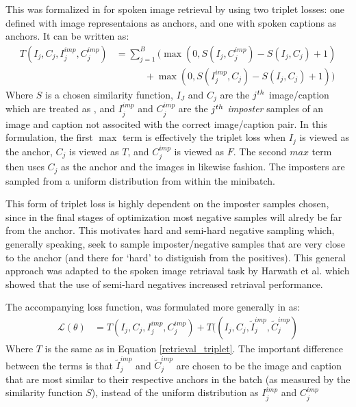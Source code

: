 This was formalized in \cite{harwath2017unsupervised} for spoken image retrieval by using two triplet losses: one defined with image representaions as anchors, and one with spoken captions as anchors.
It can be written as:
\begin{align}
    \label{retrieval_triplet}
    T(I_j, C_j, I_j^{imp}, C_j^{imp}) &= \sum_{j=1}^B \Big(\max(0,S(I_j, C_j^{imp}) - S(I_j, C_j) +1) \\
                                      &{\quad\quad\quad+} \max(0,S(I_j^{imp}, C_j) - S(I_j, C_j) +1)\Big)
\end{align}
Where $S$ is a chosen similarity function,  $I_J$ and $C_j$ are the $j^{th}$  image/caption which are treated as , and $I_j^{imp}$ and $C_j^{imp}$ are the $j^{th}$ \textit{imposter} samples of an image and caption not associted with the correct image/caption pair.
In this formulation, the first $\max$ term is effectively the triplet loss when  $I_j$ is viewed as the anchor, $C_j$ is viewed as $T$, and  $C_j^{imp}$ is viewed as $F$.
The second $max$ term then uses $C_j$ as the anchor and the images in likewise fashion.
The imposters are sampled from a uniform distribution from within the minibatch.

This form of triplet loss is highly dependent on the imposter samples chosen, since in the final stages of optimization most negative samples will alredy be far from the anchor.
This motivates hard and semi-hard negative sampling \cite{jansen2018unsupervised} which, generally speaking, seek to sample imposter/negative samples that are very close to the anchor (and there for `hard' to distiguish from the positives).
This general approach was adapted to the spoken image retriaval task by Harwath et al. \cite{harwath2018jointly} which showed that the use of semi-hard negatives increased retriaval performance.

The accompanying loss function, was formulated more generally in \cite{harwath2019learning} as:
\begin{align*}
    \mathcal{L}(\theta) &= T(I_j, C_j, I_j^{imp}, C_j^{imp}) + T((I_j, C_j, \tilde{I}_j^{imp}, \tilde{C}_j^{imp})
\end{align*}
Where $T$ is the same as in Equation \ref{retrieval_triplet}. 
The important difference between the terms is that $\tilde{I}_j^{imp}$ and $\tilde{C}_j^{imp}$ are chosen to be the image and caption that are most similar to their respective anchors in the batch (as measured by the similarity function $S$),
instead of the uniform distribution as $I_j^{imp}$ and $C_j^{imp}$


